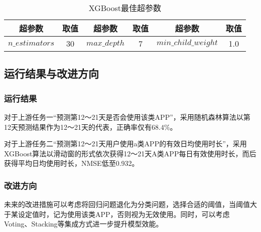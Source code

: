 \documentclass[withoutpreface,bwprint]{cumcmthesis}
\begin{document}
\begin{table}[!htbp]
    \caption{XGBoost最佳超参数}\label{tab:011} \centering
    \begin{tabular}{cccccc}
        \toprule[1.5pt]
        超参数             & 取值 & 超参数          & 取值 & 超参数                  & 取值  \\
        \midrule[1pt]
        $n\_estimators$ & 30 & $max\_depth$ & 7  & $min\_child\_weight$ & 1.0 \\
        \bottomrule[1.5pt]
    \end{tabular}
\end{table}

\subsection{运行结果与改进方向}
\subsubsection{运行结果}

对于上游任务一“预测第12～21天是否会使用该类APP”，采用随机森林算法以第12天预测结果作为12～21天的代表，正确率仅有$68.4\%$。

对于上游任务二“预测第12～21天用户使用a类APP的有效日均使用时长”，采用XGBoost算法以滑动窗的形式依次获得12～21天A类APP每日有效使用时长，而后获得平均日均使用时长，NMSE低至0.932。

\subsubsection{改进方向}

未来的改进措施可以考虑将回归问题退化为分类问题，选择合适的阈值，当阈值大于某设定值时，记为使用该类APP，否则视为无效使用。同时，可以考虑Voting、Stacking等集成方式进一步提升模型效能。
\end{document}
